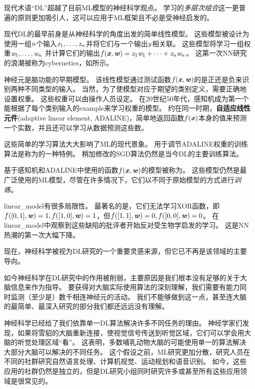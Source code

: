   
现代术语``\gls{DL}''超越了目前\gls{ML}模型的神经科学观点。
学习的\emph{多层次组合}这一更普遍的原则更加吸引人，这可以应用于\gls{ML}框架且不必是受神经启发的。
 
 
现代\gls{DL}的最早前身是从神经科学的角度出发的简单线性模型。
这些模型被设计为使用一组$\mathit{n}$个输入$\mathit{x}_1, \dots ,\mathit{x}_n$并将它们与一个输出$\mathit{y}$相关联。 
这些模型将学习一组权重$\mathit{w}_1, \dots, \mathit{w}_n $ 并计算它们的输出$f(\boldsymbol{\mathit{x}}, \boldsymbol{\mathit{w}}) = \mathit{x}_1 \mathit{w}_1 + \dots + \mathit{x}_n \mathit{w}_n$。
这第一次\gls{NN}研究的浪潮被称为\gls{cybernetics}，如所示。

神经元\citep{McCulloch43}是脑功能的早期模型。
该线性模型通过测试函数$f(\boldsymbol{\mathit{x}},\boldsymbol{\mathit{w}})$的是正还是负来识别两种不同类型的输入。
当然，为了使模型对应于期望的类别定义，需要正确地设置权重。
这些权重可以由操作人员设定。
在20世纪50年代，感知机\citep{Rosenblatt-1956,Rosenblatt-1958}成为第一个能根据了每个类别输入的\gls{example}来学习权重的模型。
约在同一时期，\textbf{自适应线性元件}(adaptive linear element, ADALINE)，简单地返回函数$f(\boldsymbol{\mathit{x}})$本身的值来预测一个实数\citep{Widrow60}，并且还可以学习从数据预测这些数。

这些简单的学习算法大大影响了\gls{ML}的现代景象。
用于调节ADALINE权重的训练算法是称为的一种特例。
稍加修改的\gls{SGD}算法仍然是当今\gls{DL}的主要训练算法。

基于感知机和ADALINE中使用的函数$f(\boldsymbol{\mathit{x}}, \boldsymbol{\mathit{w}})$的模型被称为。
这些模型仍然是最广泛使用的\gls{ML}模型，尽管在许多情况下，它们以不同于原始模型的方式进行\emph{训练}。

\gls{linear_model}有很多局限性。
最著名的是，它们无法学习XOR函数，即$f([0,1], \boldsymbol{\mathit{w}}) = 1, f([1,0], \boldsymbol{\mathit{w}})=1$，但$f([1,1], \boldsymbol{\mathit{w}})=0, f([0,0],\boldsymbol{\mathit{w}})= 0$。
在\gls{linear_model}中观察到这些缺陷的批评者开始反对受生物学启发的学习\citep{Minsky69}。
这是\gls{NN}热潮的第一次大幅下降。

现在，神经科学被视为\gls{DL}研究的一个重要灵感来源，但它已不再是该领域的主要导向。


如今神经科学在\gls{DL}研究中的作用被削弱，主要原因是我们根本没有足够的关于大脑信息来作为指导。
要获得对大脑实际使用算法的深刻理解，我们需要有能力同时监测（至少是）数千相连神经元的活动。
我们不能够做到这一点，甚至连大脑的最简单、最深入研究的部分我们都还远远没有理解\citep{olshausen:2005}。

神经科学已经给了我们依靠单一\gls{DL}算法解决许多不同任务的理由。
神经学家们发现，如果将雪貂的大脑重新连接，使视觉信号传送到听觉区域，它们可以学会用大脑的听觉处理区域``看''\citep{von2000visual}。
这表明，多数哺乳动物大脑的可能使用单一的算法解决大部分大脑可以解决的不同任务。
这个假设之前，\gls{ML}研究更加分散，研究人员在不同的社群研究自然语言处理、计算机视觉、运动规划和语音识别。
如今，这些应用的社群仍然是独立的，但是\gls{DL}研究小组同时研究许多或甚至所有这些应用领域是很常见的。

